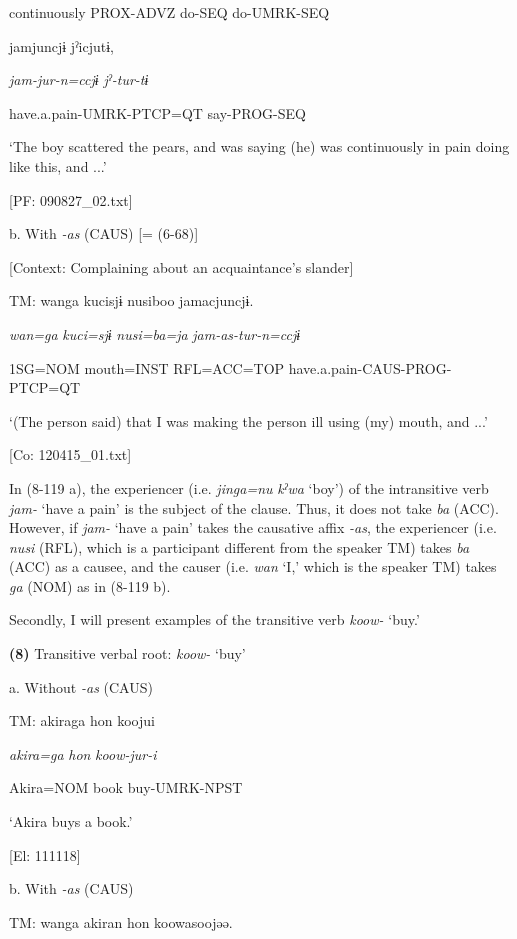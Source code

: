     continuously  PROX-ADVZ  do-SEQ  do-UMRK-SEQ

    jamjuncjɨ  jˀicjutɨ,

    \textit{jam{}-jur-n=ccjɨ  jˀ-tur-tɨ}

    have.a.pain-UMRK-PTCP=QT  say-PROG-SEQ

    ‘The boy scattered the pears, and was saying (he) was continuously in pain doing like this, and ...’

    [PF: 090827\_02.txt]

  b. With \textit{-as} (CAUS) [= (6-68)]

  [Context: Complaining about an acquaintance’s slander]

  TM:  wanga  kucisjɨ  nusiboo  jamacjuncjɨ.

    \textit{wan=ga}  \textit{kuci=sjɨ}  \textit{nusi=ba=ja}  \textit{jam-as{}-tur-n=ccjɨ}

    1SG=NOM  mouth=INST  RFL=ACC=TOP  have.a.pain-CAUS-PROG-PTCP=QT

    ‘(The person\textit{\textsubscript{} }said) that I was making the person ill using (my) mouth, and ...’

    [Co: 120415\_01.txt]

In (8-119 a), the experiencer (i.e. \textit{jinga=nu} \textit{kˀwa} ‘boy’) of the intransitive verb \textit{jam-} ‘have a pain’ is the subject of the clause. Thus, it does not take \textit{ba} (ACC). However, if \textit{jam-} ‘have a pain’ takes the causative affix \textit{{}-as}, the experiencer (i.e. \textit{nusi} (RFL), which is a participant different from the speaker TM) takes \textit{ba} (ACC) as a causee, and the causer (i.e. \textit{wan} ‘I,’ which is the speaker TM) takes \textit{ga} (NOM) as in (8-119 b).

  Secondly, I will present examples of the transitive verb \textit{koow-} ‘buy.’

\textbf{(8)}  Transitive verbal root: \textit{koow-} ‘buy’

  a. Without \textit{-as} (CAUS)

  TM:  akiraga  {\textbar}hon{\textbar}  koojui

    \textit{akira=ga}  \textit{hon}  \textit{koow{}-jur-i}

    Akira=NOM  book  buy-UMRK-NPST

    ‘Akira buys a book.’

    [El: 111118]

  b. With \textit{-as} (CAUS)

  TM:  wanga  akiran  {\textbar}hon{\textbar}  koowasoojəə.

